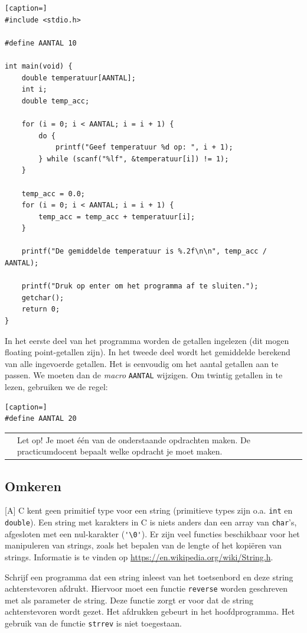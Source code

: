 \documentclass[a4paper,10pt,fleqn,twoside]{article}
\newcommand{\letop}{%
\vspace{4ex plus 1ex minus 1ex}
\begin{mdframed}[outerlinewidth = 1 ,%
roundcorner = 4 pt,%
leftmargin = 40,%
rightmargin = 40,%
backgroundcolor = yellow!40,%
outerlinecolor = red!70!black,%
innertopmargin = \topskip,%
splittopskip = \topskip,%
]
\begin{tabularx}{\linewidth}{m{1cm}X}
\Large\leftpointright & Let op! Je moet één van de onderstaande opdrachten maken. De practicumdocent bepaalt welke opdracht je moet maken.
\end{tabularx}
\end{mdframed}
\vspace{4ex plus 1ex minus 1ex}
}
\begin{document}
\begin{lstlisting}[caption=]
#include <stdio.h>

#define AANTAL 10

int main(void) {
    double temperatuur[AANTAL];
    int i;
    double temp_acc;

    for (i = 0; i < AANTAL; i = i + 1) {
        do {
            printf("Geef temperatuur %d op: ", i + 1);
        } while (scanf("%lf", &temperatuur[i]) != 1);
    }

    temp_acc = 0.0;
    for (i = 0; i < AANTAL; i = i + 1) {
        temp_acc = temp_acc + temperatuur[i];
    }

    printf("De gemiddelde temperatuur is %.2f\n\n", temp_acc / AANTAL);

    printf("Druk op enter om het programma af te sluiten.");
    getchar();
    return 0;
}
\end{lstlisting}

In het eerste deel van het programma worden de getallen ingelezen (dit mogen floating point-getallen zijn). In het tweede deel wordt het gemiddelde berekend van alle ingevoerde getallen. Het is eenvoudig om het aantal getallen aan te passen. We moeten dan de \textsl{macro} \lstinline|AANTAL| wijzigen. Om twintig getallen in te lezen, gebruiken we de regel:

\begin{lstlisting}[caption=]
#define AANTAL 20
\end{lstlisting}

\letop
\clearpage

\subsection{Omkeren}[A]
C kent geen primitief type voor een string (primitieve types zijn o.a. \lstinline|int| en \lstinline|double|). Een string met karakters in C is niets anders dan een array van \lstinline|char|’s, afgesloten met een nul-karakter (\lstinline|'\0'|). Er zijn veel functies beschikbaar voor het manipuleren van strings, zoals het bepalen van de lengte of het kopiëren van strings. Informatie is te vinden op \url{https://en.wikipedia.org/wiki/String.h}.

Schrijf een programma dat een string inleest van het toetsenbord en deze string achterstevoren afdrukt. Hiervoor moet een functie \lstinline|reverse| worden geschreven met als parameter de string. Deze functie zorgt er voor dat de string achterstevoren wordt gezet. Het afdrukken gebeurt in het hoofdprogramma. Het gebruik van de functie \lstinline|strrev| is niet toegestaan.
\end{document}
